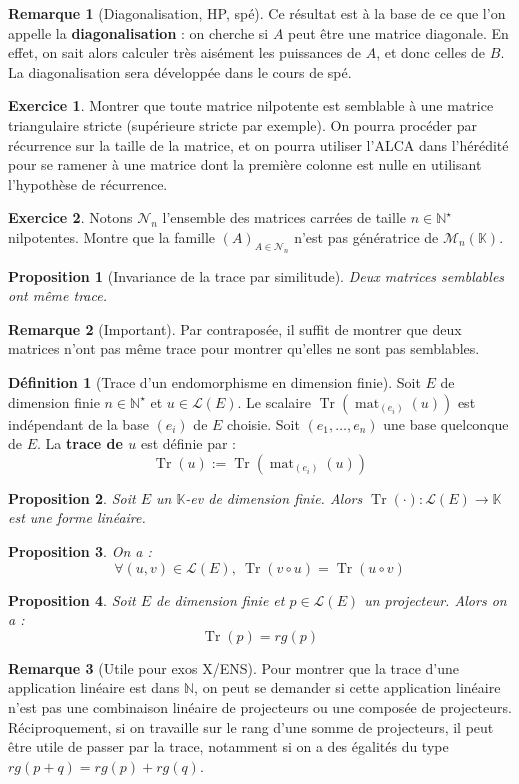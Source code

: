 \documentclass[french]{book}
\newcommand{\N}{\mathbb{N}}
\newcommand{\K}{\mathbb{K}}
\newcommand{\st}{^\star}
\theoremstyle{plain}
\newtheorem{prop}{Proposition}[chapter]
\theoremstyle{definition}
\newtheorem{dfn}{Définition}[chapter]
\newtheorem{rmq}{Remarque}[chapter]
\newtheorem{exe}{Exercice}[chapter]
\theoremstyle{remark}
\DeclareMathOperator{\tr}{Tr}
\DeclareMathOperator{\mat}{mat}
\begin{document}
\begin{rmq}[Diagonalisation, HP, spé]
	Ce résultat est à la base de ce que l'on appelle la \textbf{diagonalisation} : on cherche si $A$ peut être une matrice diagonale. En effet, on sait alors calculer très aisément les puissances de $A$, et donc celles de $B$. La diagonalisation sera développée dans le cours de spé.
\end{rmq}
\begin{exe}
	Montrer que toute matrice nilpotente est semblable à une matrice triangulaire stricte (supérieure stricte par exemple). On pourra procéder par récurrence sur la taille de la matrice, et on pourra utiliser l'ALCA dans l'hérédité pour se ramener à une matrice dont la première colonne est nulle en utilisant l'hypothèse de récurrence.
\end{exe}
\begin{exe}
	Notons $\mathcal{N}_n$ l'ensemble des matrices carrées de taille $n\in\N\st$ nilpotentes. Montre que la famille $(A)_{A\in\mathcal{N}_n}$ n'est pas génératrice de $\mathcal{M}_n(\K)$.
\end{exe}
\begin{prop}[Invariance de la trace par similitude]
	Deux matrices semblables ont même trace.
\end{prop}
\begin{rmq}[Important]
	Par contraposée, il suffit de montrer que deux matrices n'ont pas même trace pour montrer qu'elles ne sont pas semblables.
\end{rmq}
\begin{dfn}[Trace d'un endomorphisme en dimension finie]
	Soit $E$ de dimension finie $n\in\N\st$ et $u\in\mathcal{L}(E)$. Le scalaire $\tr(\mat_{(e_i)}(u))$ est indépendant de la base $(e_i)$ de $E$ choisie. Soit $(e_1,\ldots,e_n)$ une base quelconque de $E$. La \textbf{trace de $u$} est définie par : $$\tr(u):=\tr(\mat_{(e_i)}(u))$$
\end{dfn}
\begin{prop}
	Soit $E$ un $\K$-ev de dimension finie. Alors $\tr(\cdot):\mathcal{L}(E)\rightarrow\K$ est une forme linéaire.
\end{prop}
\begin{prop}
	On a : $$\forall(u,v)\in\mathcal{L}(E),\ \tr(v\circ u)=\tr(u\circ v)$$
\end{prop}
\begin{prop}
	Soit $E$ de dimension finie et $p\in\mathcal{L}(E)$ un projecteur. Alors on a : $$\tr(p)=rg(p)$$
\end{prop}
\begin{rmq}[Utile pour exos X/ENS]
	Pour montrer que la trace d'une application linéaire est dans $\N$, on peut se demander si cette application linéaire n'est pas une combinaison linéaire de projecteurs ou une composée de projecteurs. Réciproquement, si on travaille sur le rang d'une somme de projecteurs, il peut être utile de passer par la trace, notamment si on a des égalités du type $rg(p+q)=rg(p)+rg(q)$.
\end{rmq}
\end{document}
